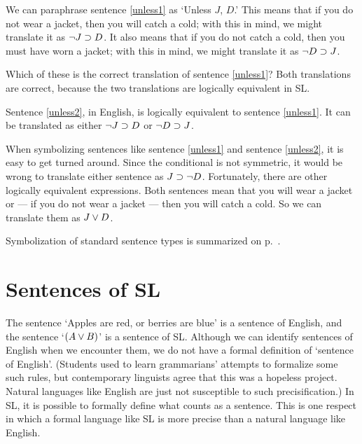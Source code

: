 We can paraphrase sentence \ref{unless1} as `Unless $J$, $D$.' This means that if you do not wear a jacket, then you will catch a cold; with this in mind, we might translate it as $\neg J \supset D$. It also means that if you do not catch a cold, then you must have worn a jacket; with this in mind, we might translate it as $\neg D \supset J$.

Which of these is the correct translation of sentence \ref{unless1}? Both translations are correct, because the two translations are logically equivalent in SL.

Sentence \ref{unless2}, in English, is logically equivalent to sentence \ref{unless1}. It can be translated as either $\neg J \supset D$ or $\neg D \supset J$.

When symbolizing sentences like sentence \ref{unless1} and sentence \ref{unless2}, it is easy to get turned around. Since the conditional is not symmetric, it would be wrong to translate either sentence as $J \supset \neg D$. Fortunately, there are other logically equivalent expressions. Both sentences mean that you will wear a jacket or --- if you do not wear a jacket --- then you will catch a cold. So we can translate them as $J \vee D$.



Symbolization of standard sentence types is summarized on p.~\pageref{app.notation}.





\section{Sentences of SL}
\label{sec:sentencesofSL}
The sentence `Apples are red, or berries are blue' is a sentence of English, and the sentence `$(A\vee B)$' is a sentence of SL. Although we can identify sentences of English when we encounter them, we do not have a formal definition of `sentence of English'. (Students used to learn grammarians' attempts to formalize some such rules, but contemporary linguists agree that this was a hopeless project. Natural languages like English are just not susceptible to such precisification.) In SL, it is possible to formally define what counts as a sentence. This is one respect in which a formal language like SL is more precise than a natural language like English.


